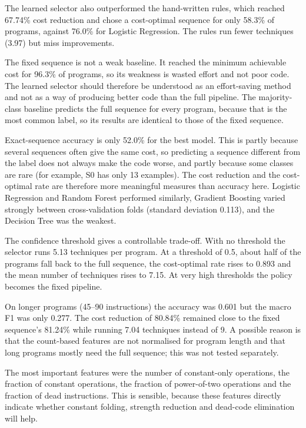 \documentclass[12pt,a4paper]{article}
\begin{document}
The learned selector also outperformed the hand-written rules, which reached 67.74\% cost reduction and chose a cost-optimal sequence for only 58.3\% of programs, against 76.0\% for Logistic Regression. The rules run fewer techniques (3.97) but miss improvements.

The fixed sequence is not a weak baseline. It reached the minimum achievable cost for 96.3\% of programs, so its weakness is wasted effort and not poor code. The learned selector should therefore be understood as an effort-saving method and not as a way of producing better code than the full pipeline. The majority-class baseline predicts the full sequence for every program, because that is the most common label, so its results are identical to those of the fixed sequence.

Exact-sequence accuracy is only 52.0\% for the best model. This is partly because several sequences often give the same cost, so predicting a sequence different from the label does not always make the code worse, and partly because some classes are rare (for example, S0 has only 13 examples). The cost reduction and the cost-optimal rate are therefore more meaningful measures than accuracy here. Logistic Regression and Random Forest performed similarly, Gradient Boosting varied strongly between cross-validation folds (standard deviation 0.113), and the Decision Tree was the weakest.

The confidence threshold gives a controllable trade-off. With no threshold the selector runs 5.13 techniques per program. At a threshold of 0.5, about half of the programs fall back to the full sequence, the cost-optimal rate rises to 0.893 and the mean number of techniques rises to 7.15. At very high thresholds the policy becomes the fixed pipeline.

On longer programs (45--90 instructions) the accuracy was 0.601 but the macro F1 was only 0.277. The cost reduction of 80.84\% remained close to the fixed sequence's 81.24\% while running 7.04 techniques instead of 9. A possible reason is that the count-based features are not normalised for program length and that long programs mostly need the full sequence; this was not tested separately.

The most important features were the number of constant-only operations, the fraction of constant operations, the fraction of power-of-two operations and the fraction of dead instructions. This is sensible, because these features directly indicate whether constant folding, strength reduction and dead-code elimination will help.
\end{document}

